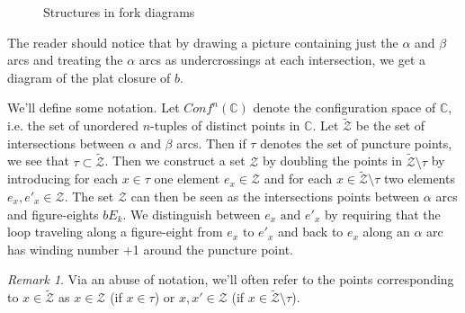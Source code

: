 \documentclass[11pt]{article}
\theoremstyle{plain} \newtheorem{thm}{Theorem}[subsection]
\theoremstyle{plain} \newtheorem{cor}[thm]{Corollary}
\theoremstyle{plain} \newtheorem{prop}[thm]{Proposition}
\theoremstyle{plain} \newtheorem{conj}[thm]{Conjecture}
\theoremstyle{plain} \newtheorem{lem}[thm]{Lemma}
\theoremstyle{definition} \newtheorem{df}[thm]{Definition}
\theoremstyle{remark} \newtheorem{rmk}[thm]{Remark}
\theoremstyle{remark} \newtheorem{obs}[thm]{Observation}
\newcommand{\Ztil}{\tld{\mathcal{Z}}}
\newcommand{\Zcal}{\mathcal{Z}}
\newcommand{\tld}[1]{\widetilde{#1}}
\begin{document}
\begin{figure}[h!]
\centering
{}\quad
{}
\caption{Structures in fork diagrams \label{fig:standardfork}}
\end{figure}

The reader should notice that by drawing a picture containing just the $\alpha$ and $\beta$ arcs and treating the $\alpha$ arcs as undercrossings at each intersection, we get a diagram of the plat closure of $b$.

We'll define some notation.  Let $Conf^{n}(\mathbb{C})$ denote the configuration space of $\mathbb{C}$, i.e. the set of unordered $n$-tuples of distinct points in $\mathbb{C}$.  Let $\Ztil$ be the set of intersections between $\alpha \text{ and } \beta$ arcs.  Then if $\tau$ denotes the set of puncture points, we see that $\tau \subset \Ztil$.  Then we construct a set $\Zcal$ by doubling the points in $\Ztil \setminus\tau$ by introducing for each $x \in \tau$ one element $e_{x} \in \Zcal$ and for each $x \in \Ztil \setminus \tau$ two elements $e_{x},e'_{x} \in \Zcal$.  The set $\Zcal$ can then be seen as the intersections points between $\alpha$ arcs and figure-eights $bE_{k}$.  We distinguish between $e_{x} \text{ and } e'_{x}$ by requiring that the loop traveling along a figure-eight from $e_{x} \text{ to } e'_{x}$ and back to $e_{x}$ along an $\alpha$ arc has winding number +1 around the puncture point.

\begin{rmk} Via an abuse of notation, we'll often refer to the points corresponding to $x \in \Ztil$ as $x \in \Zcal$ (if $x \in \tau$) or $x,x' \in \Zcal$ (if $x \in \Ztil \setminus \tau$).
\end{rmk}
\end{document}
